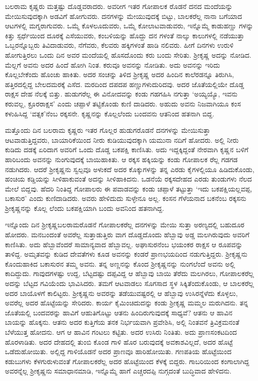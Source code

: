 ಬಲರಾಮ ಕೃಷ್ಣರು ಮತ್ತಷ್ಟು ದೊಡ್ಡವರಾದರು. ಅವರೀಗ ಇತರ ಗೋಪಾಲಕ ರೊಡನೆ ದನದ ಮಂದೆಯನ್ನು ಮೇಯಿಸುವುದಕ್ಕಾಗಿ ಅಡವಿಗೆ ಹೋಗುವರು. ದನಗಳನ್ನು ಮೇಯುವುದಕ್ಕೆ ಬಿಟ್ಟು, ಬಾಲಕರೆಲ್ಲ ನಾನಾ ಬಗೆಯಾದ ಆಟಗಳಲ್ಲಿ ಮಗ್ನರಾಗುವರು. ಒಮ್ಮೆ ಕೊಳಲೂದುವರು, ಒಮ್ಮೆ ಕೋಲಾಟವಾಡುವರು, ಇನ್ನೊಮ್ಮೆ ಕಾಡುಹಣ್ಣು ಗಳನ್ನು ಕಿತ್ತು ಸ್ಪರ್ಧೆಯಿಂದ ದೂರಕ್ಕೆ ಎಸೆಯುವರು, ಕಂಬಳಿಯನ್ನು ಹೊದ್ದು ದನ ಗಳಂತೆ ನಾಲ್ಕು ಕಾಲುಗಳಲ್ಲಿ ನಡೆಯುತ್ತಾ ಒಬ್ಬರನ್ನೊಬ್ಬರು ತಿವಿದಾಡುವರು, ನೆಗೆವರು, ಕೆಲವರು ಹಕ್ಕಿಗಳಂತೆ ಹಾಡಿ ನಲಿವರು. ಹೀಗೆ ದಿನಗಳು ಉರುಳಿ ಹೋಗುತ್ತಿರಲು ಒಂದು ದಿನ ಅವರ ಮಂದೆಯಲ್ಲಿ ಹೊಸದೊಂದು ಕರು ಬಂದು ಸೇರಿತು. ಶ್ರೀಕೃಷ್ಣ ಅದನ್ನು ನೋಡಿದ. ಮೆಲ್ಲಗೆ ಅವನು ಅದರ ಹಿಂದೆ ಹೋಗಿ ನಿಂತ. ಕರುವೂ ಅವನನ್ನು ನೋಡಿತು. ಅದು ಅವನನ್ನು ಇರಿದು ಕೊಲ್ಲಬೇಕೆಂದು ಹೊಂಚು ಹಾಕಿತು. ಅದರ ಸಂಚನ್ನು ತಿಳಿದ ಶ್ರೀಕೃಷ್ಣ ಅದರ ಹಿಂದಿನ ಕಾಲೆರಡನ್ನೂ ತಿರುಗಿಸಿ, ಹತ್ತಿರದಲ್ಲಿದ್ದ ಬೇಲದಮರಕ್ಕೆ ಎಸೆದ. ಮರದಿಂದ ದಪದಪ ಹಣ್ಣುಗಳುದುರಿದವು. ಅದರ ಜೊತೆಯಲ್ಲಿಯೇ ದೊಡ್ಡ ರಾಕ್ಷಸ ದೇಹ ನೆಲಕ್ಕೆ ಬಿತ್ತು. ಹುಡುಗರೆಲ್ಲ ಈ ವಿನೋದವನ್ನು ಕಂಡು ಗಹಗಹಿಸಿ ನಗುತ್ತಾ ‘ಅಯ್ಯಯ್ಯೊ, ಇವನು ಕರುವಲ್ಲ, ಕ್ರೂರರಾಕ್ಷಸ’ ಎಂದು ಚಪ್ಪಾಳೆ ತಟ್ಟಿಕೊಂಡು ಕುಣಿ ದಾಡಿದರು. ಅಹುದು ಅವನು ನಿಜವಾಗಿಯೂ ಕಂಸ ಕಳುಹಿಸಿದ್ದ ‘ವತ್ಸಕ’ನೆಂಬ ರಕ್ಕಸನೇ. ಕೃಷ್ಣನನ್ನು ಕೊಲ್ಲಲೆಂದು ಬಂದವನು ಆತನಿಂದ ಹತನಾಗಿ ಬಿದ್ದ.

ಮತ್ತೊಂದು ದಿನ ಬಲರಾಮ ಕೃಷ್ಣರು ಇತರ ಗೊಲ್ಲರ ಹುಡುಗರೊಡನೆ ದನಗಳನ್ನು ಮೇಯಿಸುತ್ತಾ ಆಟವಾಡುತ್ತಿದ್ದವರು, ಬಾಯಾರಿಕೆಯಿಂದ ನೀರು ಕುಡಿಯುವುದಕ್ಕಾಗಿ ಯಮುನಾ ನದಿಗೆ ಹೋದರು. ಅಲ್ಲಿ ನೀರು ಕುಡಿದು ದಡಕ್ಕೆ ಏರಿದಾಗ ಅವರಿಗೆ ಒಂದು ದೊಡ್ಡ ಬಕಪಕ್ಷಿ ಕಾಣಿಸಿತು. ಅದು ಇದ್ದಕ್ಕಿದ್ದಂತೆ ನೇರವಾಗಿ ಕೃಷ್ಣನ ಬಳಿಗೆ ಹಾರಿಬಂದು ಅವನನ್ನು ನುಂಗುವುದಕ್ಕೆ ಬಾಯಿಹಾಕಿತು. ಆ ರಕ್ಕಸ ಹಕ್ಕಿಯನ್ನು ಕಂಡು ಗೋಪಾಲಕ ರೆಲ್ಲ ಗಡಗಡ ನಡುಗಿದರು. ಆದರೆ ಶ್ರೀಕೃಷ್ಣನು ಸ್ವಲ್ಪವೂ ಅಳುಕದೆ ಅದರ ಕೊಕ್ಕುಗಳನ್ನು ತನ್ನ ಎರಡು ಕೈಗಳಲ್ಲಿಯೂ ಹಿಡಿದುಕೊಂಡು, ಹಂಚಿಯ ಕಡ್ಡಿಯನ್ನು ಸೀಳಿಹಾಕುವಂತೆ ಅದನ್ನು ಸೀಳಿಹಾಕಿದನು. ಒಡನೆಯೆ ರಕ್ಕಸದೇಹದ ಎರಡು ತುಂಡುಗಳು ನೆಲದ ಮೇಲೆ ಬಿದ್ದವು. ಹೆದರಿ ನಿಂತಿದ್ದ ಗೋಪಾಲರು ಈ ಪವಾಡವನ್ನು ಕಂಡು ಚಪ್ಪಾಳೆ ತಟ್ಟುತ್ತಾ ‘ಇದು ಬಕಪಕ್ಷಿಯಲ್ಲವಪ್ಪ, ಬಕಾಸುರ’ ಎಂದು ಕುಣಿದಾಡಿದರು. ಅವರು ಹೇಳಿದುದು ಸುಳ್ಳೇನೂ ಅಲ್ಲ. ಕಂಸನ ಗೆಳೆಯನಾದ ಬಕನೆಂಬ ರಕ್ಕಸನು ಶ್ರೀಕೃಷ್ಣನನ್ನು ಕೊಲ್ಲ ಲೆಂದು ಬಕಪಕ್ಷಿಯಾಗಿ ಬಂದು ಅವನಿಂದ ಹತನಾಗಿದ್ದ.

ಇನ್ನೊಂದು ದಿನ ಶ್ರೀಕೃಷ್ಣಬಲರಾಮರೊಡನೆ ಗೋಪಾಲಕರೆಲ್ಲ ದನಗಳನ್ನು ಮೇಯಿ ಸುತ್ತಾ ಅರಣ್ಯದಲ್ಲಿ ಬಹುದೂರ ಹೋದರು. ಮನಬಂದಂತೆ ಅವರೆಲ್ಲ ಸುತ್ತಾಡುತ್ತಿರು ವಾಗ ದೊಡ್ಡದೊಂದು ಹೆಬ್ಬಾವು ಅಡ್ಡ ಮಲಗಿರುವುದು ಅವರಿಗೆ ಕಾಣಿಸಿತು. ಅದು ಹೆಬ್ಬಾವೆಂದರೆ ಸಾಮಾನ್ಯವಾದ ಹೆಬ್ಬಾವಲ್ಲ. ಅಘಾಸುರನೆಂಬ ಭಯಂಕರ ರಾಕ್ಷಸ ಆ ರೂಪವನ್ನು ತಾಳಿದ್ದ. ಅಮೃತವನ್ನು ಕುಡಿದ ದೇವತೆಗಳು ಕೂಡ ಅವನನ್ನು ಕಂಡರೆ ಪ್ರಾಣಭಯದಿಂದ ನಡುಗುತ್ತಿದ್ದರು. ಶ್ರೀಕೃಷ್ಣನು ಕೊಂದುಹಾಕಿದ ಬಕಾಸುರನ ತಮ್ಮ ಅವನು. ತನ್ನ ಅಣ್ಣನನ್ನು ಕೊಂದ ಶ್ರೀಕೃಷ್ಣನನ್ನು ನುಂಗಲೆಂದೆ ಅವನು ಅಲ್ಲಿ ಕಾದಿದ್ದುದು. ಗಾವುದಗಳಷ್ಟು ಉದ್ದ, ಬೆಟ್ಟದಷ್ಟು ದಪ್ಪವಿದ್ದ ಆ ಹೆಬ್ಬಾವು ಬಾಯಿ ತೆರೆದು ಮಲಗಿರಲು, ಗೋಪಾಲಕರೆಲ್ಲ ಅದನ್ನು ಬೆಟ್ಟದ ಗವಿಯೆಂದು ಭಾವಿಸಿದರು. ತಮಗೆ ಆಟವಾಡಲು ಸೊಗಸಾದ ಸ್ಥಳ ಸಿಕ್ಕಿತೆಂದುಕೊಂಡು, ಆ ಬಾಲಕರೆಲ್ಲ ಅದರ ಬಾಯೊಳಗೆ ಕಾಲಿಟ್ಟರು. ಶ್ರೀಕೃಷ್ಣನು ಅವರನ್ನು ತಡೆಯುವಷ್ಟರಲ್ಲಿ ಆ ಹೆಬ್ಬಾವು ಉಸಿರನ್ನೆಳೆದು ಕೊಳ್ಳಲು, ಅವರೆಲ್ಲ ಅದರ ಹೊಟ್ಟೆಯನ್ನು ಸೇರಿದರು. ಕಾರ್ಯ ಕೈಮಿಂಚಿದುದನ್ನು ಕಂಡು ಶ್ರೀಕೃಷ್ಣ ಮಮ್ಮಲ ಮರುಗಿದನು. ತನ್ನ ಜೊತೆಯಲ್ಲಿ ಬಂದವರನ್ನು ಹಾವಿಗೆ ಆಹುತಿಗೊಟ್ಟು ಆತನು ಹಿಂದಿರುಗುವುದಕ್ಕೆ ಸಾಧ್ಯವೆ? ಆತನು ಆ ಹಾವಿನ ಬಾಯನ್ನು ಹೊಕ್ಕನು. ಆತನು ಅದರ ಕುತ್ತಿಗೆಯ ತನಕ ನಿರ್ಭಯವಾಗಿ ಪ್ರವೇಶಿಸಿ, ಅಲ್ಲಿ ನಿಂತವನೆ ತ್ರಿವಿಕ್ರಮನಂತೆ ಬೆಳೆಯುತ್ತ ಹೋದನು. ಆಗ ಆ ಹಾವಿನ ಗಂಟಲು ಕಟ್ಟಿತು. ಅದರ ಉಸಿರು ನಿಂತಿತು. ಅದು ಪ್ರಾಣಸಂಕಟದಿಂದ ಹೊರಳಾಡಿತು. ಅದರ ದೇಹದಲ್ಲಿ ತುಂಬಿ ಕೊಂಡ ಗಾಳಿ ಹೊರ ಬರುವುದಕ್ಕೆ ಅವಕಾಶವಿಲ್ಲದೆ, ಅದರ ಹೊಟ್ಟೆ ಒಡೆದುಹೋಯಿತು. ಅಲ್ಲಿದ್ದ ಗಾಳಿಯೊಡನೆ ಅದರ ಪ್ರಾಣವೂ ಹಾರಿಹೋಯಿತು. ಗಣಪತಿಯ ಹೊಟ್ಟೆಯಿಂದ ಕಡುಬುಗಳು ಕೆಳಗುರುಳುವಂತೆ ಗೋಪಾಲಕರೆಲ್ಲ ಅದರ ಹೊಟ್ಟೆಯಿಂದ ಕೆಳಕ್ಕೆ ಬಿದ್ದರು. ಗಾಬರಿಯಿಂದ ಕಂಗಾಲಾಗಿದ್ದ ಅವರನ್ನೆಲ್ಲ ಶ್ರೀಕೃಷ್ಣನು ಸಮಾಧಾನಮಾಡಿ, ಇನ್ನೊಮ್ಮೆ ಹಾಗೆ ಎಚ್ಚರದಪ್ಪಿ ನುಗ್ಗದಂತೆ ಬುದ್ಧಿವಾದ ಹೇಳಿದನು.

